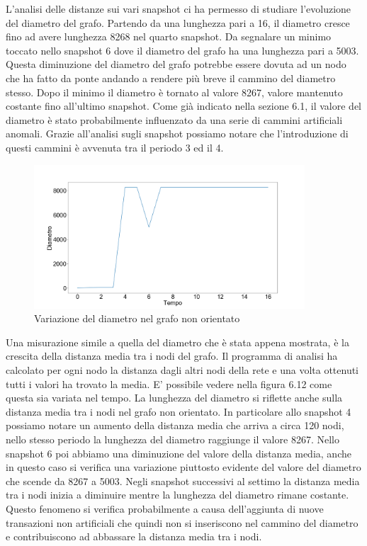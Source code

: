 \documentclass[12pt]{report}
\begin{document}
L'analisi delle distanze sui vari snapshot ci ha permesso di studiare l'evoluzione del diametro del grafo. Partendo da una lunghezza pari a 16, il diametro cresce fino ad avere lunghezza 8268 nel quarto snapshot. 
Da segnalare un minimo toccato nello snapshot 6 dove il diametro del grafo ha una lunghezza pari a 5003. Questa diminuzione del diametro del grafo potrebbe essere dovuta ad un nodo che ha fatto da ponte andando a rendere più breve il cammino del diametro stesso.
Dopo il minimo il diametro è tornato al valore 8267, valore mantenuto costante fino all'ultimo snapshot.
Come già indicato nella sezione 6.1, il valore del diametro è stato probabilmente influenzato da una serie di cammini artificiali anomali. Grazie all'analisi sugli snapshot possiamo notare che l'introduzione di questi cammini è avvenuta tra il periodo 3 ed il 4. 

\begin{figure}[H]
    \centering\includegraphics[width=0.9\textwidth]{Diametro.png}
    \caption{Variazione del diametro nel grafo non orientato}
\end{figure}

Una misurazione simile a quella del diametro che è stata appena mostrata, è la crescita della distanza media tra i nodi del grafo.
Il programma di analisi ha calcolato per ogni nodo la distanza dagli altri nodi della rete e una volta ottenuti tutti i valori ha trovato la media.
E' possibile vedere nella figura 6.12 come questa sia variata nel tempo.
La lunghezza del diametro si riflette anche sulla distanza media tra i nodi nel grafo non orientato. 
In particolare allo snapshot 4 possiamo notare un aumento della distanza media che arriva a circa 120 nodi, nello stesso periodo la lunghezza del diametro raggiunge il valore 8267.
Nello snapshot 6 poi abbiamo una diminuzione del valore della distanza media, anche in questo caso si verifica una variazione piuttosto evidente del valore del diametro che scende da 8267 a 5003.
Negli snapshot successivi al settimo la distanza media tra i nodi inizia a diminuire mentre la lunghezza del diametro rimane costante. 
Questo fenomeno si verifica probabilmente a causa dell'aggiunta di nuove transazioni non artificiali che quindi non si inseriscono nel cammino del diametro e contribuiscono ad abbassare la distanza media tra i nodi.
\end{document}
